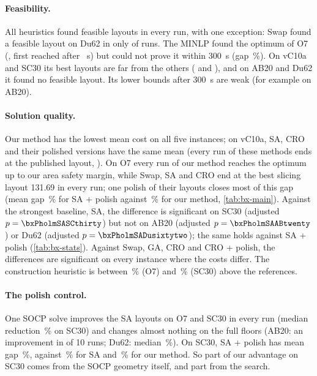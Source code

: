 

\paragraph{Feasibility.} All heuristics found feasible layouts in every run, with one exception: Swap found a
feasible layout on Du62 in only \bxNfeasSwapDusixtytwo{} of \bxNrunsSwapDusixtytwo{} runs. The MINLP found the
optimum of O7 (\bxMinlpOsevenCostTen, first reached after \bxMinlpOsevenTfirstOpt~s) but could not prove it within
300~s (gap \bxMinlpGapOseven\,\%). On vC10a and SC30 its best layouts are far from the others (\bxMinlpIncumbentvCtena{}
and \bxMinlpIncumbentSCthirty), and on AB20 and Du62 it found no feasible layout. Its lower bounds after 300~s are
weak (for example \bxMinlpBoundABtwenty{} on AB20).

\paragraph{Solution quality.} Our method has the lowest mean cost on all five instances; on vC10a, SA, CRO and their
polished versions have the same mean (every run of these methods ends at the published layout,
\bxBestOursvCtena). On O7 every run of our method reaches the optimum up to our area safety margin, while Swap, SA
and CRO end at the best slicing layout 131.69 in every run; one polish of their layouts closes most of this gap (mean gap
\bxGapMeanThreeSAPolishOseven\,\% for SA + polish against \bxGapMeanThreeOursOseven\,\% for our method,
\cref{tab:bx-main}). Against the strongest baseline, SA, the difference is significant on SC30 (adjusted
$p=\bxPholmSASCthirty$) but not on AB20 (adjusted $p=\bxPholmSAABtwenty$) or Du62 (adjusted $p=\bxPholmSADusixtytwo$);
the same holds against SA + polish (\cref{tab:bx-stats}). Against Swap, GA, CRO and CRO + polish, the differences are
significant on every instance where the costs differ. The construction heuristic is between
\bxGapMeanConstructOseven\,\% (O7) and \bxGapMeanConstructSCthirty\,\% (SC30) above the references.

\paragraph{The polish control.} One SOCP solve improves the SA layouts on O7 and SC30 in every run (median
reduction \bxPolishMedRedSAPolishSCthirty\,\% on SC30) and changes almost nothing on the full floors (AB20: an
improvement in \bxPolishNimpSAPolishABtwenty{} of 10 runs; Du62: median \bxPolishMedRedSAPolishDusixtytwo\,\%).
On SC30, SA + polish has mean gap \bxGapMeanSAPolishSCthirty\,\%, against \bxGapMeanSASCthirty\,\% for SA and
\bxGapMeanOursSCthirty\,\% for our method. So part of our advantage on SC30 comes from the SOCP geometry itself, and
part from the search.

